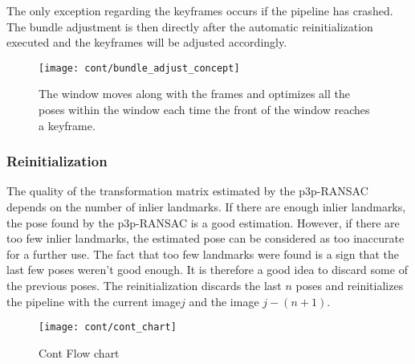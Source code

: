 The only exception regarding the keyframes occurs if the pipeline has crashed. The bundle adjustment is then directly after the automatic reinitialization executed and the keyframes will be adjusted accordingly.

\begin{figure}
	\centering
	\texttt{[image: cont/bundle\_adjust\_concept]}
	\caption{The window moves along with the frames and optimizes all the poses within the window each time the front of the window reaches a keyframe.}
	\label{fig:ba_concept}
\end{figure}

\subsubsection{Reinitialization}
The quality of the transformation matrix estimated by the p3p-RANSAC depends on the number of inlier landmarks. If there are enough inlier landmarks, the pose found by the p3p-RANSAC is a good estimation. However, if there are too few inlier landmarks, the estimated pose can be considered as too inaccurate for a further use. The fact that too few landmarks were found is a sign that the last few poses weren't good enough. It is therefore a good idea to discard some of the previous poses. The reinitialization discards the last \begin{math} n \end{math} poses and reinitializes the pipeline with the current image\begin{math} j \end{math} and the image \begin{math} j-(n+1) \end{math}. 

\begin{figure}[ht]
	\centering
	\texttt{[image: cont/cont\_chart]}
	\caption{Cont Flow chart}
	\label{img_flow_cont}
\end{figure}